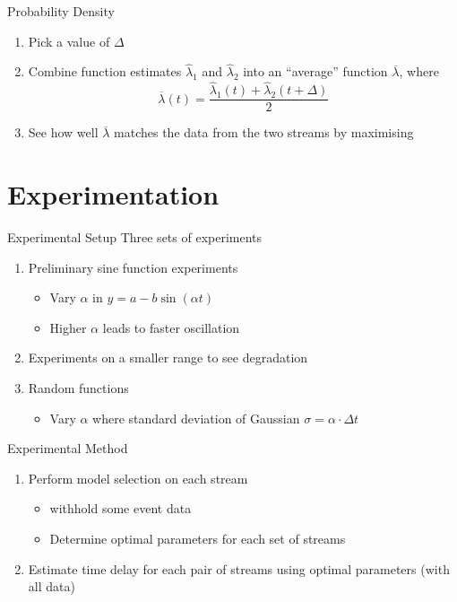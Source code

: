 \documentclass{beamer}
\begin{document}
\begin{frame}{Probability Density}
  \begin{enumerate}[<+->]
  \item Pick a value of $\Delta$
  \item Combine function estimates $\hat{\lambda}_1$ and $\hat{\lambda}_2$ into
    an ``average'' function $\overline{\lambda}$, where
    \[\overline{\lambda}(t)=\frac{\hat{\lambda}_1(t)+\hat{\lambda}_2(t+\Delta)}{2}\]
  \item See how well $\overline{\lambda}$ matches the data from the two streams
    by maximising
  \end{enumerate}
\end{frame}


\section{Experimentation}

\begin{frame}{Experimental Setup}
  Three sets of experiments
  \begin{enumerate}[<+->]
  \item Preliminary sine function experiments
    \begin{itemize}
    \item Vary $\alpha$ in $y=a-b\sin(\alpha t)$
    \item Higher $\alpha$ leads to faster oscillation
    \end{itemize}
  \item Experiments on a smaller range to see degradation
  \item Random functions
    \begin{itemize}
    \item Vary $\alpha$ where standard deviation of Gaussian $\sigma=\alpha\cdot\Delta t$
    \end{itemize}
  \end{enumerate}
\end{frame}

\begin{frame}{Experimental Method}
  \begin{enumerate}[<+->]
  \item Perform model selection on each stream
    \begin{itemize}
    \item withhold some event data
    \item Determine optimal parameters for each set of streams
    \end{itemize}
  \item Estimate time delay for each pair of streams using optimal parameters (with all data)
  \end{enumerate}
\end{frame}
\end{document}
